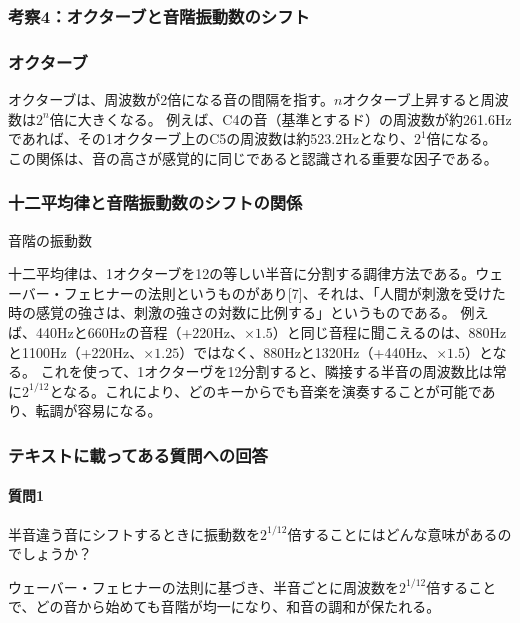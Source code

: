 \documentclass{article}
\begin{document}
\subsubsection{考察4：オクターブと音階振動数のシフト}
\begin{spacing}{1.2}
    \subsubsection*{オクターブ}
    オクターブは、周波数が2倍になる音の間隔を指す。$n$オクターブ上昇すると周波数は$2^{n}$倍に大きくなる。
    例えば、C4の音（基準とするド）の周波数が約261.6Hzであれば、その1オクターブ上のC5の周波数は約523.2Hzとなり、$2^1$倍になる。
    この関係は、音の高さが感覚的に同じであると認識される重要な因子である。
    \subsubsection*{十二平均律と音階振動数のシフトの関係}
    \begin{table}[ht] %
        \centering
        \caption{音階の振動数}
    \end{table}
    十二平均律は、1オクターブを12の等しい半音に分割する調律方法である。ウェーバー・フェヒナーの法則というものがあり[7]、それは、「人間が刺激を受けた時の感覚の強さは、刺激の強さの対数に比例する」というものである。
    例えば、440Hzと660Hzの音程（+220Hz、$\times 1.5$）と同じ音程に聞こえるのは、880Hzと1100Hz（+220Hz、$\times 1.25$）ではなく、880Hzと1320Hz（+440Hz、$\times 1.5$）となる。
    これを使って、1オクターヴを12分割すると、隣接する半音の周波数比は常に$2^{1/12}$となる。これにより、どのキーからでも音楽を演奏することが可能であり、転調が容易になる。
    \subsubsection*{テキストに載ってある質問への回答}
    \paragraph*{質問1}半音違う音にシフトするときに振動数を$2^{1/12}$倍することにはどんな意味があるのでしょうか？

    ウェーバー・フェヒナーの法則に基づき、半音ごとに周波数を$2^{1/12}$倍することで、どの音から始めても音階が均一になり、和音の調和が保たれる。

\end{spacing}
\end{document}
